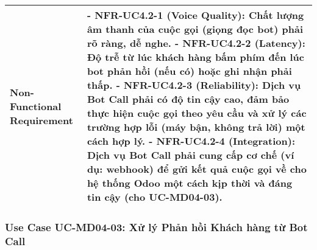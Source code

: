 \begin{longtable}{|m{4cm}|p{11cm}|}
\hline
Non-Functional Requirement & - \textbf{NFR-UC4.2-1 (Voice Quality):} Chất lượng âm thanh của cuộc gọi (giọng đọc bot) phải rõ ràng, dễ nghe. \newline - \textbf{NFR-UC4.2-2 (Latency):} Độ trễ từ lúc khách hàng bấm phím đến lúc bot phản hồi (nếu có) hoặc ghi nhận phải thấp. \newline - \textbf{NFR-UC4.2-3 (Reliability):} Dịch vụ Bot Call phải có độ tin cậy cao, đảm bảo thực hiện cuộc gọi theo yêu cầu và xử lý các trường hợp lỗi (máy bận, không trả lời) một cách hợp lý. \newline - \textbf{NFR-UC4.2-4 (Integration):} Dịch vụ Bot Call phải cung cấp cơ chế (ví dụ: webhook) để gửi kết quả cuộc gọi về cho hệ thống Odoo một cách kịp thời và đáng tin cậy (cho UC-MD04-03). \\
\hline
\end{longtable}

\subsubsection{Use Case UC-MD04-03: Xử lý Phản hồi Khách hàng từ Bot Call}

